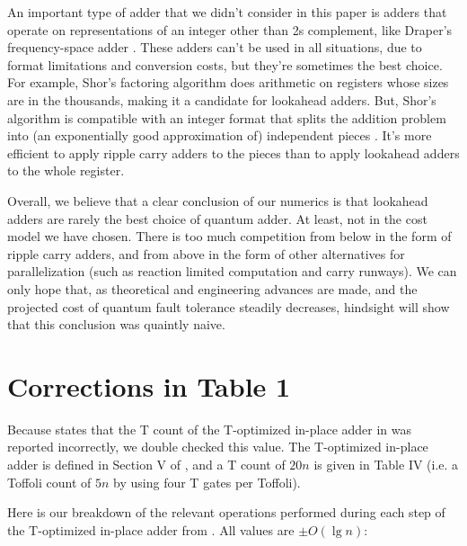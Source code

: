 \documentclass[onecolumn,unpublished]{quantumarticle}
\theoremstyle{definition}
\theoremstyle{definition}
\theoremstyle{definition}
\begin{document}
An important type of adder that we didn't consider in this paper is adders that operate on representations of an integer other than 2s complement, like Draper's frequency-space adder \cite{draper2000qftaddition}.
These adders can't be used in all situations, due to format limitations and conversion costs, but they're sometimes the best choice.
For example, Shor's factoring algorithm \cite{shor1994algorithms} does arithmetic on registers whose sizes are in the thousands, making it a candidate for lookahead adders.
But, Shor's algorithm is compatible with an integer format that splits the addition problem into (an exponentially good approximation of) independent pieces \cite{gidney2019approximate,gidney2019factor}.
It's more efficient to apply ripple carry adders to the pieces than to apply lookahead adders to the whole register.

Overall, we believe that a clear conclusion of our numerics is that lookahead adders are rarely the best choice of quantum adder.
At least, not in the cost model we have chosen.
There is too much competition from below in the form of ripple carry adders, and from above in the form of other alternatives for parallelization (such as reaction limited computation and carry runways).
We can only hope that, as theoretical and engineering advances are made, and the projected cost of quantum fault tolerance steadily decreases, hindsight will show that this conclusion was quaintly naive.




\appendix

\section{Corrections in Table 1}
\label{app:correction}

Because \cite{oonishi2020efficient} states that the T count of the T-optimized in-place adder in \cite{thapliyal2020lookahead} was reported incorrectly, we double checked this value.
The T-optimized in-place adder is defined in Section V of \cite{thapliyal2020lookahead}, and a T count of $20n$ is given in Table IV (i.e. a Toffoli count of $5n$ by using four T gates per Toffoli).

Here is our breakdown of the relevant operations performed during each step of the T-optimized in-place adder from \cite{thapliyal2020lookahead}.
All values are $\pm O(\lg n)$:
\end{document}

